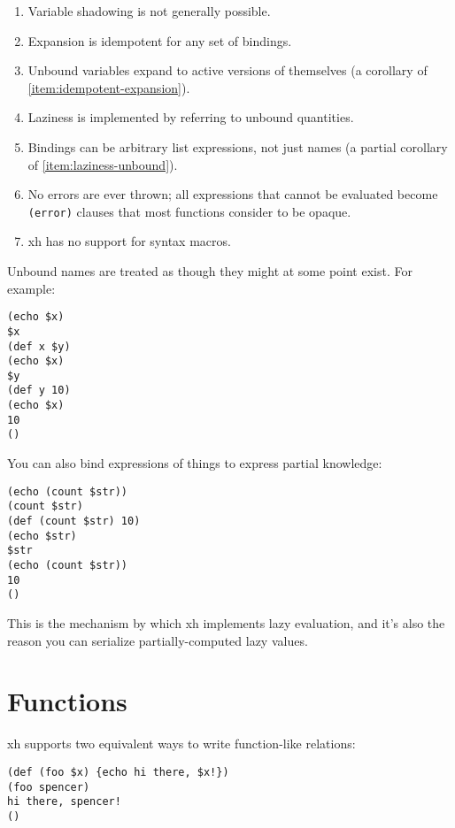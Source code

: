 \documentclass{report}
\begin{document}
\begin{enumerate}
\item{Variable shadowing is not generally possible.}
       \label{item:no-variable-shadowing}
\item{Expansion is idempotent for any set of bindings.}
       \label{item:idempotent-expansion}
\item{Unbound variables expand to active versions of themselves (a}
       corollary of \ref{item:idempotent-expansion}).
       \label{item:unbound-expansion}
\item{Laziness is implemented by referring to unbound quantities.}
       \label{item:laziness-unbound}
\item{Bindings can be arbitrary list expressions, not just names (a}
       partial corollary of \ref{item:laziness-unbound}).
       \label{item:arbitrary-bindings}
\item{No errors are ever thrown; all expressions that cannot be evaluated}
       become \verb|(error)| clauses that most functions consider to be
       opaque.
       \label{item:no-errors}
\item{xh has no support for syntax macros.}
       \label{item:no-macros}
\end{enumerate}

  Unbound names are treated as though they might at some point exist. For
  example:

\begin{verbatim}
(echo $x)
$x
(def x $y)
(echo $x)
$y
(def y 10)
(echo $x)
10
()
\end{verbatim}

  You can also bind expressions of things to express partial knowledge:

\begin{verbatim}
(echo (count $str))
(count $str)
(def (count $str) 10)
(echo $str)
$str
(echo (count $str))
10
()
\end{verbatim}

  This is the mechanism by which xh implements lazy evaluation, and it's also
  the reason you can serialize partially-computed lazy values.

\chapter{Functions}\label{chp:functions}
  xh supports two equivalent ways to write function-like relations:

\begin{verbatim}
(def (foo $x) {echo hi there, $x!})
(foo spencer)
hi there, spencer!
()
\end{verbatim}
\end{document}
